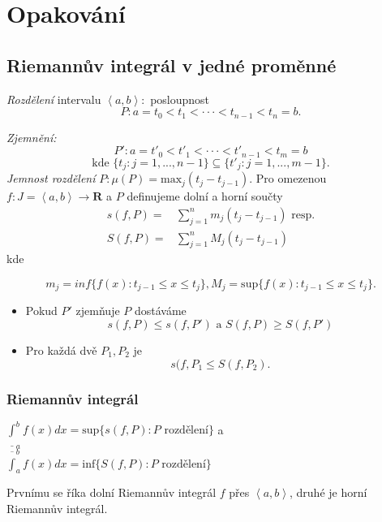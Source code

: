 \documentclass[10pt]{article}
\begin{document}
\section{Opakování}
\subsection{Riemannův integrál v jedné proměnné}
\hspace{1.2mm}
\textit{Rozdělení} intervalu $\left<a,b\right> : $ posloupnost 
\[P : a = t_0 < t_1 < \cdot \cdot \cdot < t_{n-1} < t_n = b.\]


{\normalsize
\textit{Zjemnění:
\[P' : a = t'_0 < t'_1 < \cdot \cdot \cdot < t'_{n-1} < t_m = b\]
\[\text{kde }\{t_j: j = 1,...,n-1\}\subseteq \{t'_j : j = 1,...,m-1\}.\]
}}
\textit{Jemnost rozdělení} $P: \mu(P) = \text{max}_j(t_j-t_{j-1}).$
\noindent
Pro omezenou $f:J=\left<a,b\right> \rightarrow \mathbf{R} $ a $P$ definujeme dolní a horní součty
\begin{align*}
    s(f,P) = & \sum^n_{j=1} m_j(t_j-t_{j-1}) \text{ resp.}\\
    S(f,P) = & \sum^n_{j=1} M_j(t_j-t_{j-1})
\end{align*}
kde

\[m_j = inf\{f(x) : t_{j-1} \leq x \leq t_j\}, M_j = \text{sup}\{f(x) : t_{j-1} \leq x \leq t_j\}.\]

\begin{itemize}
    \item Pokud $P'$ zjemňuje $P$ dostáváme
    \[s(f,P) \leq s(f,P') \text{ a } S(f,P) \geq S(f,P')\]
    \item Pro každá dvě $P_1, P_2$ je 
    \[s(f,P_1 \leq S(f, P_2).\]
\end{itemize}

\subsubsection{Riemannův integrál}
\hspace{1.2mm}
$\underline{\int}^b_{ a} f(x)dx = \text{sup}\{s(f,P) : P \text{ rozdělení}\}$ a
$\overline{\int}^b_{ a} f(x)dx = \text{inf}\{S(f,P) : P \text{ rozdělení}\}$ 

Prvnímu se říka dolní Riemannův integrál $f$ přes $\left<a,b\right>$, druhé je horní Riemannův integrál.
\end{document}

